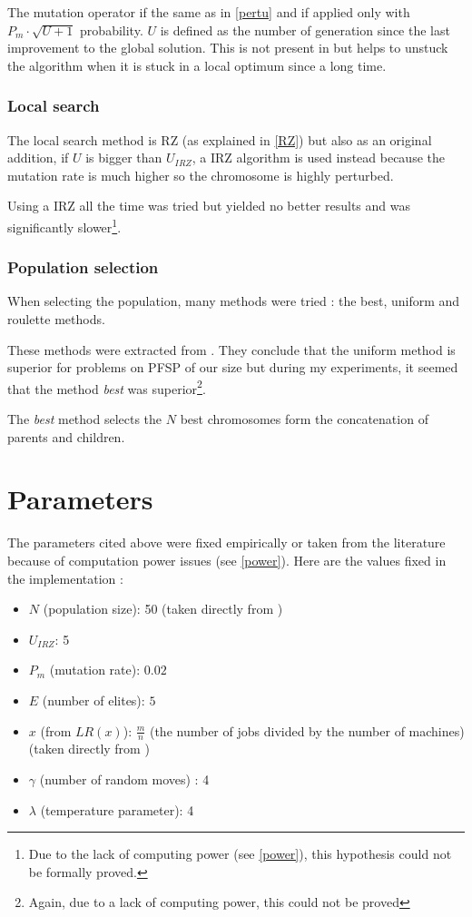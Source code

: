 \documentclass[a4paper]{article}
\begin{document}
The mutation operator if the same as in \ref{pertu} and if applied only with $P_m \cdot \sqrt{U + 1}$ probability.
$U$ is defined as the number of generation since the last improvement to the global solution. This is not present in \cite{zhang2009} but helps to unstuck the algorithm when it is stuck in a local optimum since a long time.


\subsubsection{Local search}

The local search method is RZ (as explained in \ref{RZ}) but also as an original addition, if $U$ is bigger than $U_{IRZ}$, a IRZ algorithm is used instead because the mutation rate is much higher so the chromosome is highly perturbed.

Using a IRZ all the time was tried but yielded no better results and was significantly slower\footnote{Due to the lack of computing power (see \ref{power}), this hypothesis could not be formally proved.}.

\subsubsection{Population selection}

When selecting the population, many methods were tried : the best, uniform and roulette methods.

These methods were extracted from \cite{Kouki}. They conclude that the uniform method is superior for problems on PFSP of our size but during my experiments, it seemed that the method \textit{best} was superior\footnote{Again, due to a lack of computing power, this could not be proved}.

The \textit{best} method selects the $N$ best chromosomes form the concatenation of parents and children.


\section{Parameters}

The parameters cited above were fixed empirically or taken from the literature because of computation power issues (see \ref{power}). Here are the values fixed in the implementation :

\begin{itemize}
    \item $N$ (population size): 50 (taken directly from \cite{zhang2009})
    \item $U_{IRZ}$: 5
    \item $P_m$ (mutation rate): $0.02$
    \item $E$ (number of elites): $5$
    \item $x$ (from $LR(x)$): $\frac{m}{n}$ (the number of jobs divided by the number of machines) (taken directly from \cite{panruiz2012})
    \item $\gamma$ (number of random moves) : 4
    \item $\lambda$ (temperature parameter): 4
\end{itemize}
\end{document}
